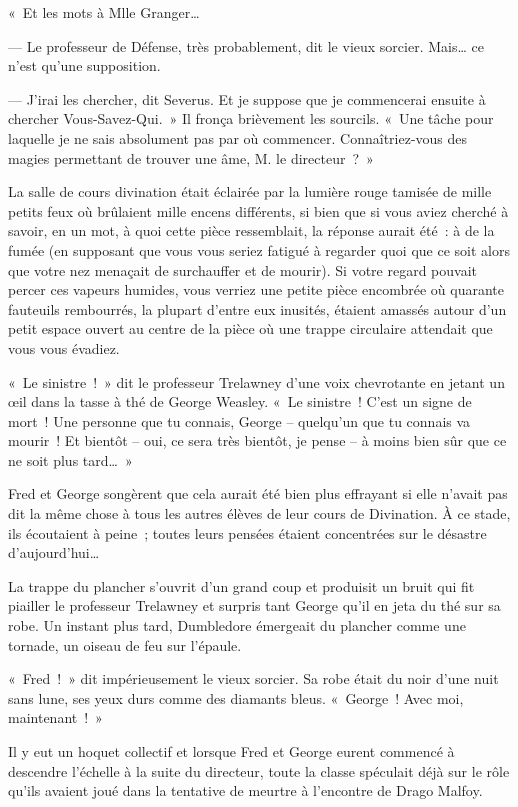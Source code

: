 «~Et les mots à Mlle Granger…

--- Le professeur de Défense, très probablement, dit le vieux sorcier.
Mais… ce n'est qu'une supposition.

--- J'irai les chercher, dit Severus.
Et je suppose que je commencerai ensuite à chercher Vous-Savez-Qui.~»
Il fronça brièvement les sourcils.
«~Une tâche pour laquelle je ne sais absolument pas par où commencer.
Connaîtriez-vous des magies permettant de trouver une âme, M. le directeur~?~»

\later

La salle de cours divination était éclairée par la lumière rouge tamisée de mille petits feux où brûlaient mille encens différents, si bien que si vous aviez cherché à savoir, en un mot, à quoi cette pièce ressemblait, la réponse aurait été~: à de la fumée (en supposant que vous vous seriez fatigué à regarder quoi que ce soit alors que votre nez menaçait de surchauffer et de mourir).
Si votre regard pouvait percer ces vapeurs humides, vous verriez une petite pièce encombrée où quarante fauteuils rembourrés, la plupart d'entre eux inusités, étaient amassés autour d'un petit espace ouvert au centre de la pièce où une trappe circulaire attendait que vous vous évadiez.

«~Le sinistre~!~»
dit le professeur Trelawney d'une voix chevrotante en jetant un œil dans la tasse à thé de George Weasley.
«~Le sinistre~!
C'est un signe de mort~!
Une personne que tu connais, George -- quelqu'un que tu connais va mourir~!
Et bientôt -- oui, ce sera très bientôt, je pense -- à moins bien sûr que ce ne soit plus tard…~»

Fred et George songèrent que cela aurait été bien plus effrayant si elle n'avait pas dit la même chose à tous les autres élèves de leur cours de Divination.
À ce stade, ils écoutaient à peine~; toutes leurs pensées étaient concentrées sur le désastre d'aujourd'hui…

La trappe du plancher s'ouvrit d'un grand coup et produisit un bruit qui fit piailler le professeur Trelawney et surpris tant George qu'il en jeta du thé sur sa robe.
Un instant plus tard, Dumbledore émergeait du plancher comme une tornade, un oiseau de feu sur l'épaule.

«~Fred~!~»
dit impérieusement le vieux sorcier.
Sa robe était du noir d'une nuit sans lune, ses yeux durs comme des diamants bleus.
«~George~!
Avec moi, maintenant~!~»

Il y eut un hoquet collectif et lorsque Fred et George eurent commencé à descendre l'échelle à la suite du directeur, toute la classe spéculait déjà sur le rôle qu'ils avaient joué dans la tentative de meurtre à l'encontre de Drago Malfoy.

